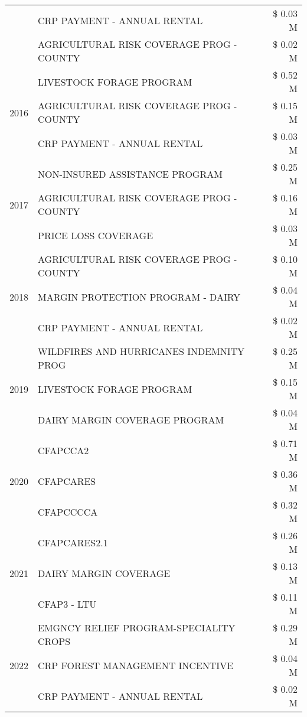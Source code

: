 \begin{tabular}{llr}
 & CRP PAYMENT - ANNUAL RENTAL & \$ 0.03 M \\
 & AGRICULTURAL RISK COVERAGE PROG - COUNTY & \$ 0.02 M \\
\cline{1-3}
\multirow[t]{3}{*}{2016} & LIVESTOCK FORAGE PROGRAM & \$ 0.52 M \\
 & AGRICULTURAL RISK COVERAGE PROG - COUNTY & \$ 0.15 M \\
 & CRP PAYMENT - ANNUAL RENTAL & \$ 0.03 M \\
\cline{1-3}
\multirow[t]{3}{*}{2017} & NON-INSURED ASSISTANCE PROGRAM & \$ 0.25 M \\
 & AGRICULTURAL RISK COVERAGE PROG - COUNTY & \$ 0.16 M \\
 & PRICE LOSS COVERAGE & \$ 0.03 M \\
\cline{1-3}
\multirow[t]{3}{*}{2018} & AGRICULTURAL RISK COVERAGE PROG - COUNTY & \$ 0.10 M \\
 & MARGIN PROTECTION PROGRAM - DAIRY & \$ 0.04 M \\
 & CRP PAYMENT - ANNUAL RENTAL & \$ 0.02 M \\
\cline{1-3}
\multirow[t]{3}{*}{2019} & WILDFIRES AND HURRICANES INDEMNITY PROG & \$ 0.25 M \\
 & LIVESTOCK FORAGE PROGRAM & \$ 0.15 M \\
 & DAIRY MARGIN COVERAGE PROGRAM & \$ 0.04 M \\
\cline{1-3}
\multirow[t]{3}{*}{2020} & CFAPCCA2 & \$ 0.71 M \\
 & CFAPCARES & \$ 0.36 M \\
 & CFAPCCCCA & \$ 0.32 M \\
\cline{1-3}
\multirow[t]{3}{*}{2021} & CFAPCARES2.1 & \$ 0.26 M \\
 & DAIRY MARGIN COVERAGE & \$ 0.13 M \\
 & CFAP3 - LTU & \$ 0.11 M \\
\cline{1-3}
\multirow[t]{3}{*}{2022} & EMGNCY RELIEF PROGRAM-SPECIALITY CROPS & \$ 0.29 M \\
 & CRP FOREST MANAGEMENT INCENTIVE & \$ 0.04 M \\
 & CRP PAYMENT - ANNUAL RENTAL & \$ 0.02 M \\
\cline{1-3}
\bottomrule
\end{tabular}
